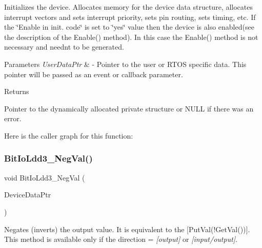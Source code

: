 Initializes the device. Allocates memory for the device data structure, allocates interrupt vectors and sets interrupt priority, sets pin routing, sets timing, etc. If the \char`\"{}\+Enable
    in init. code\char`\"{} is set to \char`\"{}yes\char`\"{} value then the device is also enabled(see the description of the Enable() method). In this case the Enable() method is not necessary and needn\textquotesingle{}t to be generated. 


\begin{DoxyParams}{Parameters}
{\em User\+Data\+Ptr} & -\/ Pointer to the user or R\+T\+OS specific data. This pointer will be passed as an event or callback parameter. \\
\hline
\end{DoxyParams}
\begin{DoxyReturn}{Returns}

\begin{DoxyItemize}
\item Pointer to the dynamically allocated private structure or N\+U\+LL if there was an error. 
\end{DoxyItemize}
\end{DoxyReturn}
Here is the caller graph for this function\+:
\mbox{\label{group___bit_io_ldd3__module_gaf2f93fab1bcb91f83a96805a4cdec84e}} 
\subsubsection{\texorpdfstring{Bit\+Io\+Ldd3\+\_\+\+Neg\+Val()}{BitIoLdd3\_NegVal()}}
{\footnotesize\ttfamily void Bit\+Io\+Ldd3\+\_\+\+Neg\+Val (\begin{DoxyParamCaption}\item[{\hyperlink{group___p_e___types__module_gac5cf1362f1f0e3a2ce71b1bf2276d091}{L\+D\+D\+\_\+\+T\+Device\+Data} $\ast$}]{Device\+Data\+Ptr }\end{DoxyParamCaption})}



Negates (inverts) the output value. It is equivalent to the \mbox{[}Put\+Val(!\+Get\+Val())\mbox{]}. This method is available only if the direction = {\itshape \mbox{[}output\mbox{]}} or {\itshape \mbox{[}input/output\mbox{]}}. 


